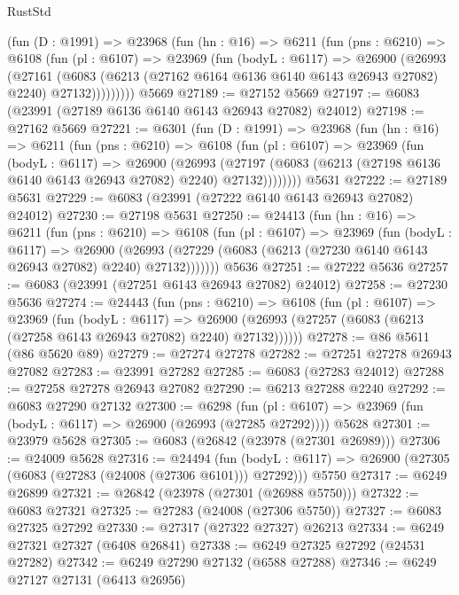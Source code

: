 \begin{lexlean}{RustStd}
\begin{coremodule}
      (fun (D : @1991) =>
      @23968
        (fun (hn : @16) =>
        @6211
          (fun (pns : @6210) =>
          @6108
            (fun (pl : @6107) =>
            @23969
              (fun (bodyL : @6117) =>
              @26900
                (@26993
                  (@27161
                    (@6083
                      (@6213 (@27162 @6164 @6136 @6140 @6143 @26943 @27082) @2240)
                      @27132)))))))))
    @5669
@27189 := @27152 @5669
@27197 := @6083 (@23991 (@27189 @6136 @6140 @6143 @26943 @27082) @24012)
@27198 := @27162 @5669
@27221 := @6301
    (fun (D : @1991) =>
    @23968
      (fun (hn : @16) =>
      @6211
        (fun (pns : @6210) =>
        @6108
          (fun (pl : @6107) =>
          @23969
            (fun (bodyL : @6117) =>
            @26900
              (@26993
                (@27197 (@6083 (@6213 (@27198 @6136 @6140 @6143 @26943 @27082) @2240) @27132))))))))
    @5631
@27222 := @27189 @5631
@27229 := @6083 (@23991 (@27222 @6140 @6143 @26943 @27082) @24012)
@27230 := @27198 @5631
@27250 := @24413
    (fun (hn : @16) =>
    @6211
      (fun (pns : @6210) =>
      @6108
        (fun (pl : @6107) =>
        @23969
          (fun (bodyL : @6117) =>
          @26900
            (@26993 (@27229 (@6083 (@6213 (@27230 @6140 @6143 @26943 @27082) @2240) @27132)))))))
    @5636
@27251 := @27222 @5636
@27257 := @6083 (@23991 (@27251 @6143 @26943 @27082) @24012)
@27258 := @27230 @5636
@27274 := @24443
    (fun (pns : @6210) =>
    @6108
      (fun (pl : @6107) =>
      @23969
        (fun (bodyL : @6117) =>
        @26900 (@26993 (@27257 (@6083 (@6213 (@27258 @6143 @26943 @27082) @2240) @27132))))))
@27278 := @86 @5611 (@86 @5620 @89)
@27279 := @27274 @27278
@27282 := @27251 @27278 @26943 @27082
@27283 := @23991 @27282
@27285 := @6083 (@27283 @24012)
@27288 := @27258 @27278 @26943 @27082
@27290 := @6213 @27288 @2240
@27292 := @6083 @27290 @27132
@27300 := @6298
    (fun (pl : @6107) => @23969 (fun (bodyL : @6117) => @26900 (@26993 (@27285 @27292))))
    @5628
@27301 := @23979 @5628
@27305 := @6083 (@26842 (@23978 (@27301 @26989)))
@27306 := @24009 @5628
@27316 := @24494
    (fun (bodyL : @6117) => @26900 (@27305 (@6083 (@27283 (@24008 (@27306 @6101))) @27292)))
    @5750
@27317 := @6249 @26899
@27321 := @26842 (@23978 (@27301 (@26988 @5750)))
@27322 := @6083 @27321
@27325 := @27283 (@24008 (@27306 @5750))
@27327 := @6083 @27325 @27292
@27330 := @27317 (@27322 @27327) @26213
@27334 := @6249 @27321 @27327 (@6408 @26841)
@27338 := @6249 @27325 @27292 (@24531 @27282)
@27342 := @6249 @27290 @27132 (@6588 @27288)
@27346 := @6249 @27127 @27131 (@6413 @26956)

\end{coremodule}
\end{lexlean}
